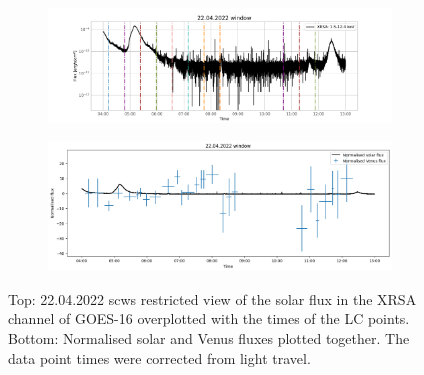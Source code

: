     \begin{figure}[H]
        \centering
        \begin{subfigure}{\textwidth}
            \includegraphics[width=\textwidth]{report/Figures/results/GOES_22.png}
        \end{subfigure}%
        \hspace{1em}
        \begin{subfigure}{\textwidth}
            \centering
            \includegraphics[width=\textwidth]{report/Figures/results/norm_22.png}
        \end{subfigure}
        \caption{Top: 22.04.2022 scws restricted view of the solar flux in the XRSA channel of GOES-16 overplotted with the times of the LC points.
        Bottom: Normalised solar and Venus fluxes plotted together. The data point times were corrected from light travel.}
        \label{goes22}
    \end{figure}

